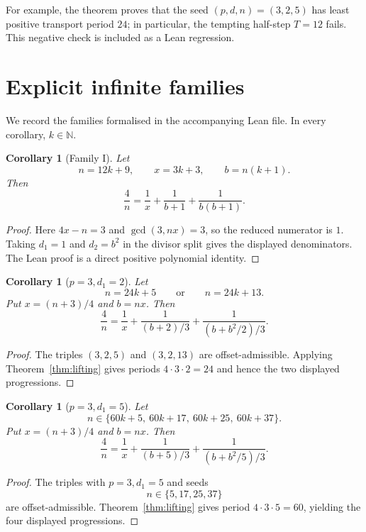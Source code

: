 \documentclass[11pt]{article}
\newtheorem{corollary}[theorem]{Corollary}
\theoremstyle{remark}
\newcommand{\N}{\mathbb{N}}
\begin{document}
For example, the theorem proves that the seed \((p,d,n)=(3,2,5)\) has least
positive transport period \(24\); in particular, the tempting half-step
\(T=12\) fails.  This negative check is included as a Lean regression.

\section{Explicit infinite families}

We record the families formalised in the accompanying Lean file.  In every
corollary, \(k\in\N\).

\begin{corollary}[Family I]\label{cor:family-I}
Let
\[
  n=12k+9,\qquad x=3k+3,\qquad b=n(k+1).
\]
Then
\[
  \frac4n=\frac1x+\frac1{b+1}+\frac1{b(b+1)}.
\]
\end{corollary}

\begin{proof}
Here \(4x-n=3\) and \(\gcd(3,nx)=3\), so the reduced numerator is \(1\).
Taking \(d_1=1\) and \(d_2=b^2\) in the divisor split gives the displayed
denominators.  The Lean proof is a direct positive polynomial identity.
\end{proof}

\begin{corollary}[\(p=3,d_1=2\)]\label{cor:d2}
Let
\[
  n=24k+5\qquad\text{or}\qquad n=24k+13.
\]
Put \(x=(n+3)/4\) and \(b=nx\).  Then
\[
  \frac4n
  =\frac1x
   +\frac1{(b+2)/3}
   +\frac1{(b+b^2/2)/3}.
\]
\end{corollary}

\begin{proof}
The triples \((3,2,5)\) and \((3,2,13)\) are offset-admissible.  Applying
Theorem~\ref{thm:lifting} gives periods \(4\cdot3\cdot2=24\) and hence the two
displayed progressions.
\end{proof}

\begin{corollary}[\(p=3,d_1=5\)]\label{cor:d5}
Let
\[
  n\in
  \{60k+5,\ 60k+17,\ 60k+25,\ 60k+37\}.
\]
Put \(x=(n+3)/4\) and \(b=nx\).  Then
\[
  \frac4n
  =\frac1x
   +\frac1{(b+5)/3}
   +\frac1{(b+b^2/5)/3}.
\]
\end{corollary}

\begin{proof}
The triples with \(p=3,d_1=5\) and seeds
\[
  n\in\{5,17,25,37\}
\]
are offset-admissible.  Theorem~\ref{thm:lifting} gives period
\(4\cdot3\cdot5=60\), yielding the four displayed progressions.
\end{proof}
\end{document}
